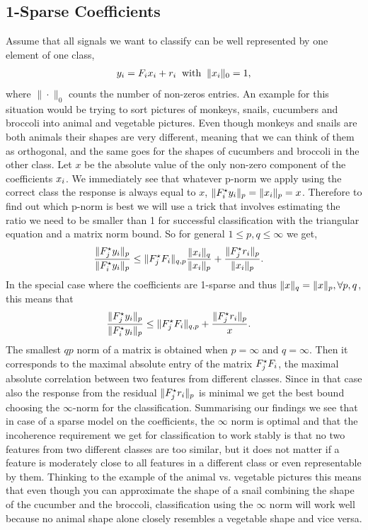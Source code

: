 \documentclass[11pt]{article}
\begin{document}
\subsection{1-Sparse Coefficients}
Assume that all signals we want to classify can be well represented by one element of one class, \ie
\begin{align}
{y}_i= {F}_i x_i + r_i \: \mbox{ with } \: \|x_i\|_0 = 1,
\end{align}
where $\|\cdot\|_0$ counts the number of non-zeros entries.
An example for this situation would be trying to sort pictures of monkeys, snails, cucumbers and broccoli into animal and vegetable pictures. Even though monkeys and snails are both animals their shapes are very different, meaning that we can think of them as orthogonal, and the same goes for the shapes of cucumbers and broccoli in the other class.
Let $x$ be the absolute value of the only non-zero component of the coefficients $x_i$. We immediately see that whatever p-norm we apply using the correct class the response is always equal to $x$, $\| {F}_i^\star {y}_i \|_p=\|x_i\|_p = x$. Therefore to find out which p-norm is best we will use a trick that involves estimating the ratio we need to be smaller than 1 for successful classification with the triangular equation and a matrix norm bound. So for general $1 \leq p,q \leq \infty$ we get,
\begin{align}\label{pq-bound}
\frac{\|{F}_j^\star {y}_i\|_p}{\|{F}^\star_i{y}_i\|_p} &\leq \|{F}_j^\star {F}_i \|_{q,p} \frac{\|x_i\|_q}{\|x_i\|_p} +  \frac{\| {F}_j^\star r_i\|_p}{\| x_i\|_p}.
\end{align}
In the special case where the coefficients are 1-sparse and thus $\|x\|_q=\|x\|_p,  \forall p,q$, this means that
\begin{align}
\frac{\|{F}_j^\star {y}_i\|_p}{\|{F}^\star_i{y}_i\|_p} &\leq \|{F}_j^\star {F}_i \|_{q,p} +  \frac{\| {F}_j^\star r_i\|_p}{x}.\notag
\end{align}
The smallest $qp$ norm of a matrix is obtained when $p=\infty$ and $q=\infty$. Then it corresponds to the maximal absolute entry of the matrix ${F}_j^\star {F}_i$, \ie the maximal absolute correlation between two features from different classes. Since in that case also the response from the residual $\| {F}_j^\star r_i\|_p$ is minimal we get the best bound choosing the $\infty$-norm for the classification.
Summarising our findings we see that in case of a sparse model on the coefficients, the $\infty$ norm is optimal and that the incoherence requirement we get for classification to work stably is that no two features from two different classes are too similar, but it does not matter if a feature is moderately close to all features in a different class or even representable by them. Thinking to the example of the animal vs. vegetable pictures this means that even though you can approximate the shape of a snail combining the shape of the cucumber and the broccoli, classification using the $\infty$ norm will work well because no animal shape alone closely resembles a vegetable shape and vice versa.
\end{document}
